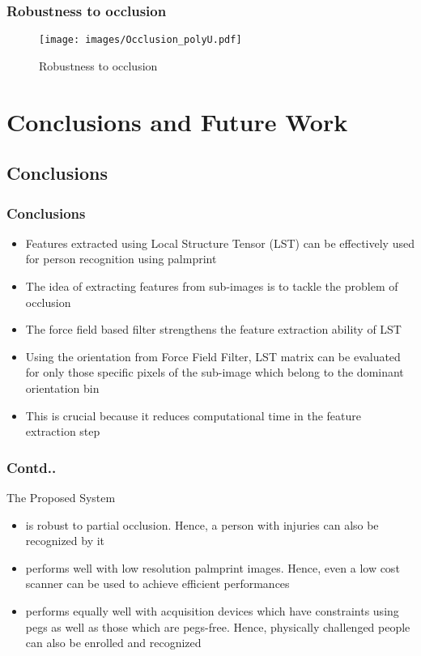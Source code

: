 \documentclass{beamer}
\begin{document}
\begin{frame}
\frametitle{Robustness to occlusion}
\begin{figure}[htp]
\begin{center}
\texttt{[image: images/Occlusion\_polyU.pdf]}
\caption{Robustness to occlusion\label{Occlusion_polyu} }
\end{center}
\end{figure}
\end{frame}

\section{Conclusions and Future Work}
\subsection*{Conclusions}
\begin{frame}
\frametitle{Conclusions}
	\begin{itemize}
		\item Features extracted using Local Structure Tensor (LST) can be effectively used for person recognition using palmprint
		\item The idea of extracting features from sub-images is to tackle the problem of occlusion 
		\item The force field based filter strengthens the feature extraction ability of LST 
		\item Using the orientation from Force Field Filter, LST matrix can be evaluated for only those specific pixels of the sub-image which belong to the dominant orientation bin 
		\item This is crucial because it reduces computational time in the feature extraction step
	\end{itemize}
\end{frame}


\begin{frame}
\frametitle{Contd..}
The Proposed System
			\begin{itemize}
				\item is robust to partial occlusion. Hence, a person with injuries can also be recognized by it 
				\item performs well with low resolution palmprint images. Hence, even a low cost scanner can be used to achieve efficient performances 
				\item performs equally well with acquisition devices which have constraints using pegs as well as those which are pegs-free. Hence, physically challenged people can also be enrolled and recognized 
			\end{itemize}
\end{frame}
\end{document}
